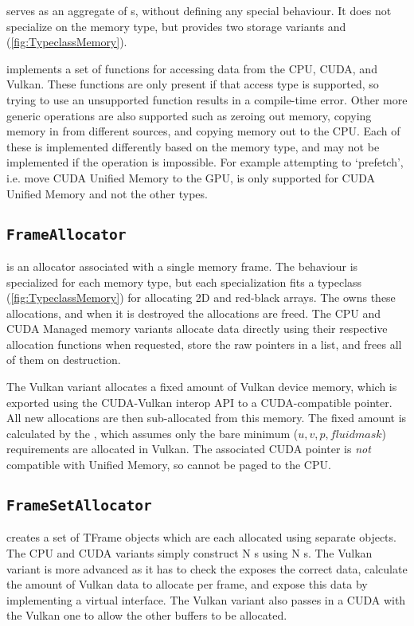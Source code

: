  serves as an aggregate of s, without defining any special behaviour.
It does not specialize on the memory type, but provides two storage variants  and  (\cref{fig:TypeclassMemory}).

 implements a set of functions for accessing data from the CPU, CUDA, and Vulkan.%
These functions are only present if that access type is supported, so trying to use an unsupported function results in a compile-time error.
Other more generic operations are also supported such as zeroing out memory, copying memory in from different sources, and copying memory out to the CPU.
Each of these is implemented differently based on the memory type, and may not be implemented if the operation is impossible.
For example attempting to `prefetch', i.e. move CUDA Unified Memory to the GPU, is only supported for CUDA Unified Memory and not the other types.

\subsection{\texttt{FrameAllocator}}
 is an allocator associated with a single memory frame.
The behaviour is specialized for each memory type, but each specialization fits a typeclass (\cref{fig:TypeclassMemory}) for allocating 2D and red-black arrays.
The  owns these allocations, and when it is destroyed the allocations are freed.
The CPU and CUDA Managed memory variants allocate data directly using their respective allocation functions when requested, store the raw pointers in a list, and frees all of them on destruction.

The Vulkan variant allocates a fixed amount of Vulkan device memory, which is exported using the CUDA-Vulkan interop API to a CUDA-compatible pointer.
All new allocations are then sub-allocated from this memory.
The fixed amount is calculated by the , which assumes only the bare minimum ($u, v, p, fluidmask$) requirements are allocated in Vulkan.
The associated CUDA pointer is \emph{not} compatible with Unified Memory, so cannot be paged to the CPU.

\subsection{\texttt{FrameSetAllocator}}
 creates a set of TFrame objects which are each allocated using separate  objects.
The CPU and CUDA variants simply construct N s using N s.
The Vulkan variant is more advanced as it has to check the  exposes the correct data, calculate the amount of Vulkan data to allocate per frame, and expose this data by implementing a virtual  interface.
The Vulkan variant also passes in a CUDA  with the Vulkan one to allow the other buffers to be allocated.

